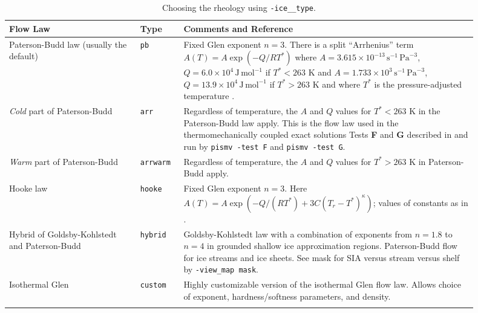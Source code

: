 \documentclass[11pt,final]{amsart}
\renewcommand{\t}[1]{\texttt{#1}}
\newcommand{\und}{\_\!\_}
\begin{document}
\begin{table}[ht]
\caption{Choosing the rheology using \t{-ice\und type}.}\label{tab:flowlaw}
\small
\begin{tabular}{p{0.25\linewidth}p{0.08\linewidth}p{0.57\linewidth}}\hline
\textbf{Flow Law} & \textbf{Type} & \textbf{Comments and Reference} \\ \hline
Paterson-Budd law (usually the default)  &  \t{pb} &   Fixed Glen exponent $n=3$.  There is a split ``Arrhenius'' term $A(T) = A \exp(-Q/RT^*)$ where \mbox{$A = 3.615 \times 10^{-13}\, \text{s}^{-1}\, \text{Pa}^{-3}$}, \mbox{$Q = 6.0 \times 10^4\, \text{J}\, \text{mol}^{-1}$} if $T^* < 263$ K and
 \mbox{$A = 1.733 \times 10^{3}\, \text{s}^{-1}\, \text{Pa}^{-3}$}, \mbox{$Q = 13.9 \times 10^4\, \text{J}\, \text{mol}^{-1}$} if $T^* > 263$ K and where $T^*$ is the pressure-adjusted temperature \cite{PatersonBudd}. \\
\emph{Cold} part of Paterson-Budd &  \t{arr} &   Regardless of temperature, the $A$ and $Q$ values for $T^*<263$ K in  the Paterson-Budd law apply.  This is the flow law used in the thermomechanically coupled exact solutions Tests \textbf{F} and \textbf{G} described in \cite{BBL,BB} and run by \verb|pismv -test F| and \verb|pismv -test G|. \\

\emph{Warm} part of Paterson-Budd     &  \t{arrwarm} & Regardless of temperature, the $A$ and $Q$ values for $T^*>263$ K in Paterson-Budd apply.\\
Hooke law   &  \t{hooke} &  Fixed Glen exponent $n=3$.  Here  $A(T) = A \exp(-Q/(RT^*) + 3C (T_r - T^*)^\kappa)$; values of  constants as in \cite{Hooke,PayneBaldwin}.\\
Hybrid of Goldsby-Kohlstedt and Paterson-Budd & \t{hybrid} &     Goldsby-Kohlstedt law with a combination of exponents  from $n=1.8$ to $n=4$ \cite{GoldsbyKohlstedt} in grounded  shallow ice approximation regions.  Paterson-Budd flow  for ice streams and ice sheets. See mask for SIA versus stream versus shelf by \verb|-view_map mask|. \\
Isothermal Glen & \t{custom} & Highly customizable version of the isothermal Glen flow law.  Allows choice of exponent, hardness/softness parameters, and density. \\
\hline
\normalsize	
\end{tabular}
\end{table}
\end{document}
